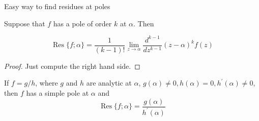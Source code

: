 \documentclass{beamer}
\DeclareMathOperator{\Res}{Res}
\begin{document}
\begin{frame}{Easy way to find residues at poles}
\begin{theorem}
Suppose that $f$ has a pole of order $k$ at $\alpha$.  Then

$$\Res\{f;\alpha\}=\frac{1}{(k-1)!}\lim_{z\to\alpha} \frac{d^{k-1}}{dz^{k-1}} (z-\alpha)^kf(z)$$
\end{theorem}
\begin{proof}Just compute the right hand side.
\end{proof}
\begin{corollary}
If $f=g/h$, where $g$ and $h$ are analytic at $\alpha$, $g(\alpha)\neq 0, h(\alpha)=0, h^\prime(\alpha)\neq 0$, then $f$ has a simple pole at $\alpha$ and
$$\Res\{f;\alpha\}=\frac{g(\alpha)}{h^\prime(\alpha)}$$
\end{corollary}
\end{frame}
\end{document}
